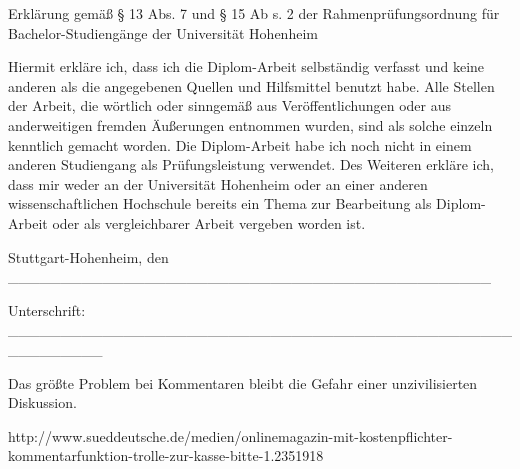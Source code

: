 
Erklärung gemäß § 13 Abs. 7 und § 15 Ab
s. 2  der Rahmenprüfungsordnung für 
Bachelor-Studiengänge der Universität Hohenheim

Hiermit erkläre ich, dass ich die Diplom-Arbeit selbständig verfasst und keine 
anderen als die angegebenen Quellen und Hilfsmittel benutzt 
habe. Alle Stellen der Arbeit, die wörtlich oder sinngemäß aus 
Veröffentlichungen oder aus anderweitigen 
fremden Äußerungen entnommen wurden, sind als solche einzeln kenntlich gemacht 
worden. 
Die Diplom-Arbeit habe ich noch nicht in einem anderen Studiengang als 
Prüfungsleistung verwendet. 
Des Weiteren erkläre ich, dass mir weder
 an der Universität Hohenheim oder an 
einer anderen wissenschaftlichen Hochschule bereits ein Thema zur Bearbeitung als 
Diplom-Arbeit oder als vergleichbarer Arbeit vergeben worden ist.  


Stuttgart-Hohenheim, den ______________________________________________ 


Unterschrift: _________________________________________________________ 









Das größte Problem bei Kommentaren bleibt die Gefahr einer unzivilisierten Diskussion. 

http://www.sueddeutsche.de/medien/onlinemagazin-mit-kostenpflichter-kommentarfunktion-trolle-zur-kasse-bitte-1.2351918